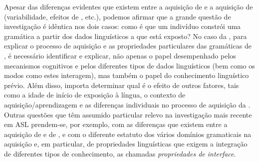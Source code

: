\documentclass[output=paper]{LSP/langsci}
\begin{document}
Apesar das diferenças evidentes que existem entre a aquisição de  e a aquisição de  (variabilidade, efeitos de , etc.), podemos afirmar que a grande questão de investigação é idêntica nos dois casos: como é que um indivíduo constrói uma gramática a partir dos dados linguísticos a que está exposto? No caso da , para explicar o processo de aquisição e as propriedades particulares das gramáticas de , é necessário identificar e explicar, não apenas o papel desempenhado pelos mecanismos cognitivos e pelos diferentes tipos de dados linguísticos (bem como os modos como estes interagem), mas também o papel do conhecimento linguístico prévio. Além disso, importa determinar qual é o efeito de outros fatores, tais como a idade de início de exposição à língua, o contexto de aquisição/aprendizagem e as diferenças individuais no processo de aquisição da . Outras questões que têm assumido particular relevo na investigação mais recente em ASL prendem-se, por exemplo, com as diferenças que existem entre a aquisição de  e de , e com o diferente estatuto dos vários domínios gramaticais na aquisição e, em particular, de propriedades linguísticas que exigem a integração de diferentes tipos de conhecimento, as chamadas \textit{propriedades de interface}.







{\sloppy
\printbibliography[heading=subbibliography,notkeyword=this]
}
\end{document}
